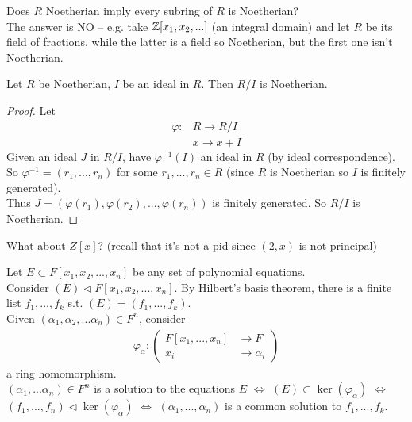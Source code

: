 \documentclass[a4paper]{article}
\begin{document}
Does $R$ Noetherian imply every subring of $R$ is Noetherian?\\
The answer is NO -- e.g. take $\mathbb{Z}[x_1,x_2,...]$ (an integral domain) and let $R$ be its field of fractions, while the latter is a field so Noetherian, but the first one isn't Noetherian.\\

\begin{prop}
Let $R$ be Noetherian, $I$ be an ideal in $R$. Then $R/I$ is Noetherian.
\begin{proof}
Let
\begin{equation*}
\begin{aligned}
\varphi : &R \to R/I\\
&x \to x+I
\end{aligned}
\end{equation*}
Given an ideal $J$ in $R/I$, have $\varphi^{-1}\left(I\right)$ an ideal in $R$ (by ideal correspondence).\\
So $\varphi^{-1} = \left(r_1,...,r_n\right)$ for some $r_1,...,r_n\in R$ (since $R$ is Noetherian so $I$ is finitely generated).\\
Thus $J=\left(\varphi\left(r_1\right),\varphi\left(r_2\right),...,\varphi\left(r_n\right)\right)$ is finitely generated. So $R/I$ is Noetherian.
\end{proof}
\end{prop}

What about $Z[x]$? (recall that it's not a pid since $(2,x)$ is not principal)\\


\begin{rem}
Let $E\subset F[x_1,x_2,...,x_n]$ be any set of polynomial equations.\\
Consider $\left(E\right) \triangleleft F[x_1,x_2,...,x_n]$. By Hilbert's basis theorem, there is a finite list $f_1,...,f_k$ s.t. $\left(E\right) = \left(f_1,...,f_k\right)$.\\
Given $\left(\alpha_1,\alpha_2,...\alpha_n\right)\in F^n$, consider
\begin{equation*}
\begin{aligned}
\varphi_\alpha: \left(
\begin{array}{ll}
F[x_1,...,x_n] &\to F\\
x_i &\to \alpha_i
\end{array}
\right)
\end{aligned}
\end{equation*}
a ring homomorphism.\\
$\left(\alpha_1,...\alpha_n\right)\in F^n$ is a solution to the equations $E$ $\iff$ $\left(E\right) \subset \ker \left(\varphi_\alpha\right)$ $\iff$ $\left(f_1,...,f_n\right)\triangleleft \ker\left(\varphi_\alpha\right)$ $\iff$ $\left(\alpha_1,...,\alpha_n\right)$ is a common solution to $f_1,...,f_k$.
\end{rem}
\end{document}
